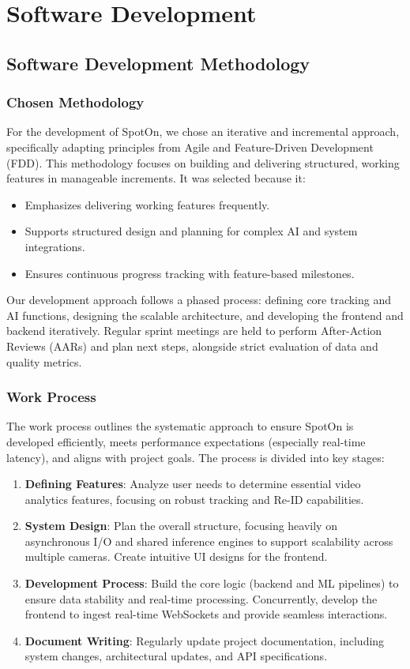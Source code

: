 \chapter{Software Development}
\label{chap:software-development}

\section{Software Development Methodology}
\label{section:software-development-methodology}

\subsection{Chosen Methodology}
For the development of SpotOn, we chose an iterative and incremental approach, specifically adapting principles from Agile and Feature-Driven Development (FDD). This methodology focuses on building and delivering structured, working features in manageable increments. It was selected because it:
\begin{itemize}
    \item Emphasizes delivering working features frequently.
    \item Supports structured design and planning for complex AI and system integrations.
    \item Ensures continuous progress tracking with feature-based milestones.
\end{itemize}
Our development approach follows a phased process: defining core tracking and AI functions, designing the scalable architecture, and developing the frontend and backend iteratively. Regular sprint meetings are held to perform After-Action Reviews (AARs) and plan next steps, alongside strict evaluation of data and quality metrics.

\subsection{Work Process}
The work process outlines the systematic approach to ensure SpotOn is developed efficiently, meets performance expectations (especially real-time latency), and aligns with project goals. The process is divided into key stages:
\begin{enumerate}
    \item \textbf{Defining Features}: Analyze user needs to determine essential video analytics features, focusing on robust tracking and Re-ID capabilities.
    \item \textbf{System Design}: Plan the overall structure, focusing heavily on asynchronous I/O and shared inference engines to support scalability across multiple cameras. Create intuitive UI designs for the frontend.
    \item \textbf{Development Process}: Build the core logic (backend and ML pipelines) to ensure data stability and real-time processing. Concurrently, develop the frontend to ingest real-time WebSockets and provide seamless interactions.
    \item \textbf{Document Writing}: Regularly update project documentation, including system changes, architectural updates, and API specifications.
\end{enumerate}

